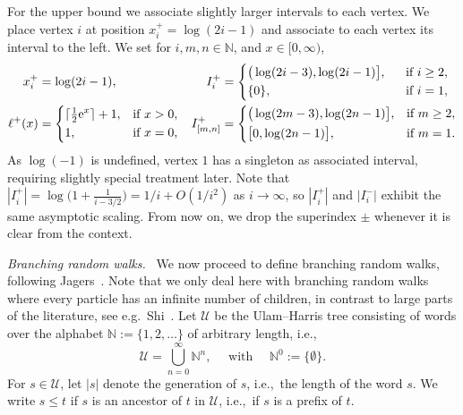 \documentclass[a4paper, a4wide, 10pt, reqno]{amsart}
\theoremstyle{plain}
\theoremstyle{definition}
\numberwithin{equation}{section}
\newcommand{\N}{{\mathbb N}}
\newcommand{\re}{{\mathrm e}}
\begin{document}
\smallskip
For the upper bound we associate slightly larger intervals to each vertex. We place vertex $i$ at position $x^+_i=\log(2i-1)$ and associate to
each vertex its interval to the left. We set for $i,m,n\in\N$, and $x\in[0,\infty)$,
\begin{equation}\label{eq:i-upper}
\begin{aligned}
x^+_i&=\log(2i-1), 
	&I_i^+&=
    \begin{dcases}
        \big(\log(2i-3), \log(2i-1)\big],\phantom{..}&\text{if }i\ge2,\\
        \{0\},&\text{if }i=1,
    \end{dcases}\\
    \ell^+(x)&=\begin{dcases}\lceil \tfrac{1}{2}\re^x\rceil+1,&\text{if }x>0,\\
    1,&\text{if }x=0,\end{dcases}
    &I^+_{[m,n]}&=\begin{dcases}
        \big(\log(2m-3),\log(2n-1)\big],&\text{if }m\ge2,\\
       \big [0,\log(2n-1)\big],&\text{if }m=1.
    \end{dcases}
    \end{aligned}
\end{equation}
As $\log(-1)$ is undefined, vertex $1$ has a singleton as associated interval, requiring slightly special treatment later. Note that $|I_i^+|=\log\big(1+\tfrac{1}{i-3/2}\big)=1/i+O(1/i^{2})$ as $i\to\infty$, so $|I_i^+|$ and $|I_i^-|$ exhibit the same asymptotic scaling. From now on,
we drop the superindex $\pm$ whenever it is clear from the context.

\medskip \noindent\emph{Branching random walks.\ }
We now proceed to define branching random walks, following Jagers~\cite{Jagers1989}. Note that we only deal here with branching random walks where every particle has an infinite number of children, in contrast to large parts of the literature, see e.g.~Shi~\cite{ShiLectureNotes}.
Let $\mathscr U$ be the Ulam--Harris tree consisting of words over the alphabet $\N := \{1,2,\ldots\}$ of arbitrary length, i.e.,
\begin{equation}\label{eq:ulam-harris}
	\mathscr U = \bigcup_{n=0}^\infty \N^n,\quad\text{ with } \quad\N^0:=\{\emptyset\}.
\end{equation}
For $s\in \mathscr U$, let $|s|$ denote the generation of $s$, i.e.,~the length of the word $s$. We write $s\le t$ if $s$ is an ancestor of $t$ in $\mathscr U$, i.e.,~if $s$ is a prefix of $t$.
\end{document}
